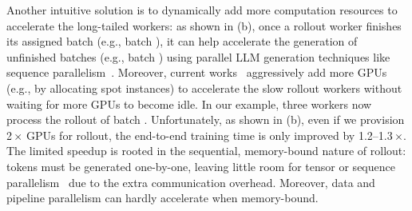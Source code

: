 Another intuitive solution is to dynamically add more computation resources to accelerate the long-tailed workers:
as shown in { (b)},
once a rollout worker finishes its assigned batch (e.g., batch ),
it can help accelerate the generation of unfinished batches (e.g., batch ) using
parallel LLM generation techniques like sequence parallelism~\cite{loongserve}.
Moreover, current works~\cite{rlboost} aggressively add more GPUs (e.g., by allocating spot instances)
to accelerate the slow rollout workers without waiting for more GPUs to become idle.
In our example, three workers now process the rollout of batch .
Unfortunately, 
as shown in {} (b), even if we provision 2\,$\times$ GPUs for rollout, 
the end-to-end training time is only improved by {1.2--1.3\,$\times$}.
The limited speedup is rooted in the 
sequential, memory-bound nature of rollout: 
tokens must be generated one-by-one, 
leaving little room for tensor or sequence parallelism~\cite{loongserve} 
due to the extra communication overhead.
Moreover, data and pipeline parallelism can hardly accelerate 
when memory-bound.

\vspace{2.mm}
\noindent {}







